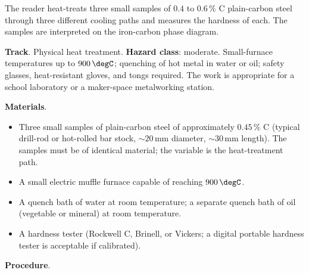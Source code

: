 \begin{project}
The reader heat-treats three small samples of $0.4$ to $0.6\,\%$ C
plain-carbon steel through three different cooling paths and measures
the hardness of each. The samples are interpreted on the iron-carbon
phase diagram.

\textbf{Track}. Physical heat treatment.
\textbf{Hazard class}: moderate. Small-furnace temperatures up to
$900\,\degC$; quenching of hot metal in water or oil; safety glasses,
heat-resistant gloves, and tongs required. The work is appropriate
for a school laboratory or a maker-space metalworking station.

\textbf{Materials}.

\begin{itemize}[leftmargin=*]
\item Three small samples of plain-carbon steel of approximately
  $0.45\,\%$ C (typical drill-rod or hot-rolled bar stock, $\sim 20\,
  \text{mm}$ diameter, $\sim 30\,\text{mm}$ length). The samples must
  be of identical material; the variable is the heat-treatment path.
\item A small electric muffle furnace capable of reaching $900\,
  \degC$.
\item A quench bath of water at room temperature; a separate quench
  bath of oil (vegetable or mineral) at room temperature.
\item A hardness tester (Rockwell C, Brinell, or Vickers; a digital
  portable hardness tester is acceptable if calibrated).
\end{itemize}

\textbf{Procedure}.


\end{project}
